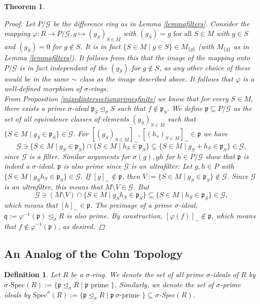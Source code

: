 \documentclass{article}
\def\p{\mathfrak{p}}
\def\q{\mathfrak{q}}
\def\s{\sigma}
\def\si{\unlhd_{\sigma}}
\def\Spec{\text{Spec}}
\def\fa{\text{ for all }}
\newenvironment{bew}{\begin{proof}[Proof]}{\end{proof}}
\theoremstyle{plain}
\newtheorem{theorem}[Satz]{Theorem}
\newtheorem{defn}[Satz]{Definition}
\theoremstyle{definition}
\begin{document}
\begin{theorem}
\begin{bew}
Let $P/\mathcal{G}$ be the difference ring as in Lemma \ref{lemmafilters}. Consider the mapping $\varphi: R \rightarrow P/\mathcal{G}, g \mapsto (g_S)_{S \in M}$ with $(g_S) = g \fa S \in M$ with $g \in S$ and $(g_S) = 0$ for $g \notin S$. 
It is in fact $\{ S \in M \mid g \in S \} \in M_{\{g\}}$ (with $M_{\{g\}}$ as in Lemma \ref{lemmafilters}). It follows from this that the image of the mapping onto $P/\mathcal{G}$ is in fact independant of the $(g_S)$ for $g \notin S$, as any other choice of these would be in the same $\sim$ class as the image described above.
It follows that $\varphi$ is a well-defined morphism of $\s$-rings. \\
\indent From Proposition \ref{mixedintersectionprimesfinite} we know that for every $S \in M$, there exists a prime $\s$-ideal $\p_S \si S$ such that $f \notin \p_S$. 
We define $\p \subseteq P/\mathcal{G}$ as the set of all equivalence classes of elements $(g_S)_{S \in M}$ such that $\{ S \in M \mid g_S \in \p_S \} \in \mathcal{G}$. 
For $[(g_S)_{S \in M}]_{\sim}, [(h_s)_{S \in M}]_{\sim} \in \p$ we have $$ \mathcal{G} \ni \{ S \in M \mid  g_S \in \p_S \} \cap  \{ S \in M \mid  h_S \in \p_S \} \subseteq \{ S \in M \mid  g_S + h_S \in \p_S \} \in \mathcal{G},$$
since $\mathcal{G}$ is a filter. Similar arguments for $\s(g), gh$ for $h \in P/\mathcal{G}$ show that $\p$ is indeed a $\s$-ideal. $\p$ is also prime since $\mathcal{G}$ is an ultrafilter:
Let $g,h \in P$ with $\{ S \in M \mid g_Sh_S \in \p_S \} \in \mathcal{G}$. If $[g]_\sim \notin \p$, then $V:= \{ S \in M \mid g_S \in \p_S \} \notin \mathcal{G}$. Since $\mathcal{G}$ is an ultrafilter, 
this means that $M \setminus V \in \mathcal{G}$. But $$\mathcal{G} \ni (M \setminus V) \cap \{ S \in M \mid g_S h_S \in \p_S \} \subseteq \{ S \in M \mid h_S \in \p_S \} \in \mathcal{G},$$
which means that $[h]_\sim \in \p$. The preimage of a prime $\s$-ideal, $\q := \varphi^{-1}(\p) \si R$ is also prime. By construction, $[\varphi(f)]_\sim \notin \p$, which means that $f \notin \varphi^{-1}(\p)$, as desired. 

\end{bew}
\end{theorem}

\subsection{An Analog of the Cohn Topology}

\begin{defn}
Let $R$ be a $\s$-ring. We denote the set of all prime $\s$-ideals of $R$ by $\s$-$\Spec(R):= \{ \p \si R \mid \p \text{ prime }\}$. Similarly, we denote the set of $\s$-prime ideals by $\Spec^\s(R):= \{ \p \si R \mid \p ~ \s\text{-prime }\} \subseteq \s$-Spec$(R)$.
\index{$\s$-$\Spec$} \index{$\Spec^\s$}
\end{defn}
\end{document}
